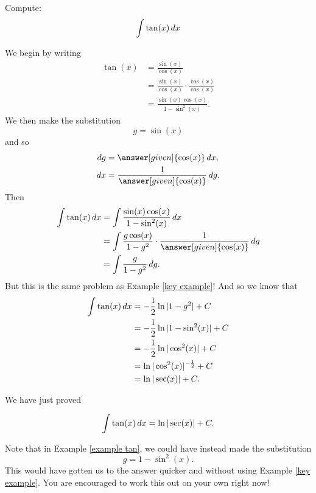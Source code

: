 \documentclass{ximera}
\begin{document}

\begin{example}\label{example tan}
Compute:
\[
\int \tan(x) \mathop{}\!d x
\]
\begin{explanation}
We begin by writing
\begin{align*}
\tan(x) &= \frac{\sin(x)}{\cos(x)}  \\
&= \frac{\sin(x)}{\cos(x)} \cdot \frac{\cos(x)}{\cos(x)}  \\
&= \frac{\sin(x) \cos(x)}{1 - \sin^2(x)}.
\end{align*}
We then make the substitution
\[
g = \sin(x)
\]
and so
\begin{align*}
\d g &= \answer[given]{\cos(x)} \d x,\\
\d x &= \frac{1}{\answer[given]{\cos(x)}} \d g.
\end{align*}
Then
\begin{align*}
\int \tan(x) \d x &= \int \frac{\sin(x) \cos(x)}{1 - \sin^2(x)} \d x  \\
&= \int \frac{g \cos(x)}{1 - g^2} \cdot \frac{1}{\answer[given]{\cos(x)}} \d g  \\
&= \int \frac{g}{1-g^2} \d g.
\end{align*}
But this is the same problem as Example \ref{key example}!  
And so we know that
\begin{align*}
\int \tan(x) \mathop{}\!d x &= - \frac{1}{2} \ln|1-g^2| + C  \\
&= - \frac{1}{2} \ln|1-\sin^2 (x)| + C  \\
&= - \frac{1}{2} \ln|\cos^2(x)| + C  \\
&= \ln|\cos^2(x)|^{- \frac{1}{2}} + C  \\
&= \ln|\sec(x)| + C.
\end{align*}
\end{explanation}
\end{example}

We have just proved

\begin{theorem}
\[
\int \tan(x) \mathop{}\!d x = \ln|\sec(x)| + C.
\]
\end{theorem}

Note that in Example \ref{example tan}, we could have instead made the substitution
\[
g = 1-\sin^2(x).
\]
This would have gotten us to the answer quicker and without using Example \ref{key example}.  
You are encouraged to work this out on your own right now!
\end{document}

